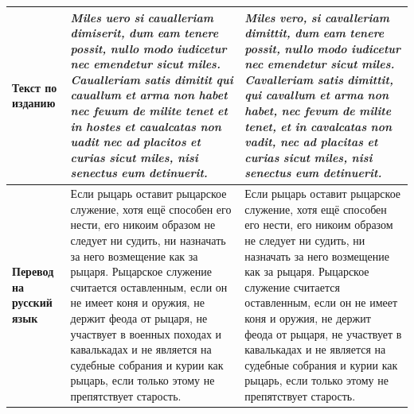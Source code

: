 \begin{center}
\begin{longtable}{|p{}|p{}|p{}|}
\textbf{Текст по изданию} & \emph{Miles}\emph{ }\emph{uero}\emph{ }\emph{si}\emph{ }\emph{caualleriam}\emph{ }\emph{dimiserit}\emph{, }\emph{dum}\emph{ }\emph{eam}\emph{ }\emph{tenere}\emph{ }\emph{possit}\emph{, }\emph{nullo}\emph{ }\emph{modo}\emph{ }\emph{iudicetur}\emph{ }\emph{nec}\emph{ }\emph{emendetur}\emph{ }\emph{sicut}\emph{ }\emph{miles}\emph{. }\emph{Caualleriam}\emph{ }\emph{satis}\emph{ }\emph{dimitit}\emph{ }\emph{qui}\emph{ }\emph{cauallum}\emph{ }\emph{et}\emph{ }\emph{arma}\emph{ }\emph{non}\emph{ }\emph{habet}\emph{ }\emph{nec}\emph{ }\emph{feuum}\emph{ de }\emph{milite}\emph{ }\emph{tenet}\emph{ }\emph{et}\emph{ in }\emph{hostes}\emph{ }\emph{et}\emph{ }\emph{caualcatas}\emph{ }\emph{non}\emph{ }\emph{uadit}\emph{ }\emph{nec}\emph{ }\emph{ad}\emph{ }\emph{placitos}\emph{ }\emph{et}\emph{ }\emph{curias}\emph{ }\emph{sicut}\emph{ }\emph{miles}\emph{, }\emph{nisi}\emph{ }\emph{senectus}\emph{ }\emph{eum}\emph{ }\emph{detinuerit}\emph{.} & \emph{Miles}\emph{ }\emph{vero}\emph{, }\emph{si}\emph{ }\emph{cavalleriam}\emph{ }\emph{dimittit}\emph{, }\emph{dum}\emph{ }\emph{eam}\emph{ }\emph{tenere}\emph{ }\emph{possit}\emph{, }\emph{nullo}\emph{ }\emph{modo}\emph{ }\emph{iudicetur}\emph{ }\emph{nec}\emph{ }\emph{emendetur}\emph{ }\emph{sicut}\emph{ }\emph{miles}\emph{. }\emph{Cavalleriam}\emph{ }\emph{satis}\emph{ }\emph{dimittit}\emph{, }\emph{qui}\emph{ }\emph{cavallum}\emph{ }\emph{et}\emph{ }\emph{arma}\emph{ }\emph{non}\emph{ }\emph{habet}\emph{, }\emph{nec}\emph{ }\emph{fevum}\emph{ de }\emph{milite}\emph{ }\emph{tenet}\emph{, }\emph{et}\emph{ in }\emph{cavalcatas}\emph{ }\emph{non}\emph{ }\emph{vadit}\emph{, }\emph{nec}\emph{ }\emph{ad}\emph{ }\emph{placitas}\emph{ }\emph{et}\emph{ }\emph{curias}\emph{ }\emph{sicut}\emph{ }\emph{miles}\emph{, }\emph{nisi}\emph{ }\emph{senectus}\emph{ }\emph{eum}\emph{ }\emph{detinuerit}\emph{.} \\ \hline
\textbf{Перевод на русский язык} & Если рыцарь оставит рыцарское служение, хотя ещё способен его нести, его никоим образом не следует ни судить, ни назначать за него возмещение как за рыцаря. Рыцарское служение считается оставленным, если он не имеет коня и оружия, не держит феода от рыцаря, не участвует в военных походах и кавалькадах и не является на судебные собрания и курии как рыцарь, если только этому не препятствует старость. & Если рыцарь оставит рыцарское служение, хотя ещё способен его нести, его никоим образом не следует ни судить, ни назначать за него возмещение как за рыцаря. Рыцарское служение считается оставленным, если он не имеет коня и оружия, не держит феода от рыцаря, не участвует в кавалькадах и не является на судебные собрания и курии как рыцарь, если только этому не препятствует старость. \\ \hline
\end{longtable}
\end{center}

